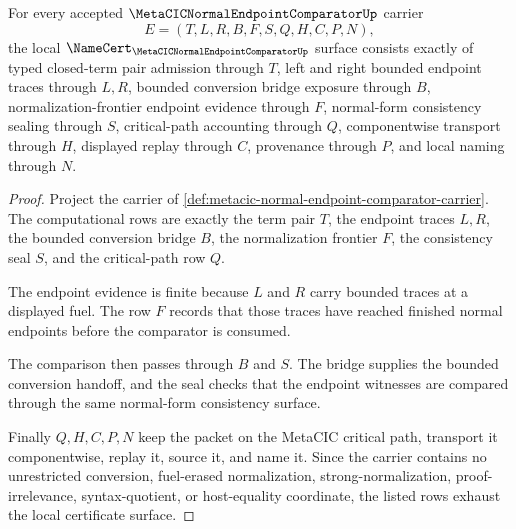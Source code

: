 \begin{theorem}
\label{thm:metacic-normal-endpoint-comparator-namecert-obligations}
For every accepted $\MetaCICNormalEndpointComparatorUp$ carrier
$$
E=(T,L,R,B,F,S,Q,H,C,P,N),
$$
the local $\NameCert_{\MetaCICNormalEndpointComparatorUp}$ surface consists exactly of typed closed-term pair admission through $T$, left and right bounded endpoint traces through $L,R$, bounded conversion bridge exposure through $B$, normalization-frontier endpoint evidence through $F$, normal-form consistency sealing through $S$, critical-path accounting through $Q$, componentwise transport through $H$, displayed replay through $C$, provenance through $P$, and local naming through $N$.
\end{theorem}
\begin{proof}
Project the carrier of \autoref{def:metacic-normal-endpoint-comparator-carrier}. The computational rows are exactly the term pair $T$, the endpoint traces $L,R$, the bounded conversion bridge $B$, the normalization frontier $F$, the consistency seal $S$, and the critical-path row $Q$.

The endpoint evidence is finite because $L$ and $R$ carry bounded traces at a displayed fuel. The row $F$ records that those traces have reached finished normal endpoints before the comparator is consumed.

The comparison then passes through $B$ and $S$. The bridge supplies the bounded conversion handoff, and the seal checks that the endpoint witnesses are compared through the same normal-form consistency surface.

Finally $Q,H,C,P,N$ keep the packet on the MetaCIC critical path, transport it componentwise, replay it, source it, and name it. Since the carrier contains no unrestricted conversion, fuel-erased normalization, strong-normalization, proof-irrelevance, syntax-quotient, or host-equality coordinate, the listed rows exhaust the local certificate surface.
\end{proof}

